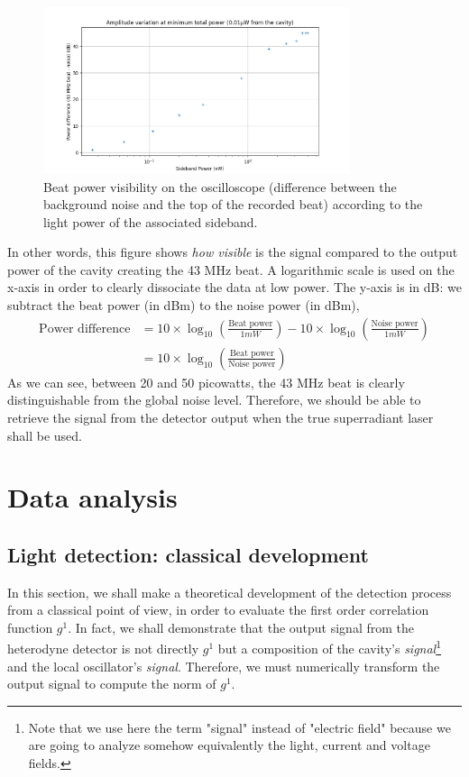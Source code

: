 \documentclass[11pt]{report}
\begin{document}
\begin{figure}[h!]
\centering
\includegraphics[width=0.8\textwidth]{sb-power-visibility}
\caption{Beat power visibility on the oscilloscope (difference between the background noise and the top of the recorded beat) according to the light power of the associated sideband.}
\label{fig:sb-power-visibility}
\end{figure}

In other words, this figure shows \textit{how visible} is the signal compared to the output power of the cavity creating the 43 MHz beat. A logarithmic scale is used on the x-axis in order to clearly dissociate the data at low power. The y-axis is in dB: we subtract the beat power (in dBm) to the noise power (in dBm),
\begin{align}
\textrm{Power difference} &= 10 \times \log_{10}\left( \frac{\textrm{Beat power}}{1 mW} \right) - 10 \times \log_{10}\left( \frac{\textrm{Noise power}}{1 mW} \right) \\
&= 10 \times \log_{10}\left( \frac{\textrm{Beat power}}{\textrm{Noise power}} \right)
\end{align}
As we can see, between 20 and 50 picowatts, the 43 MHz beat is clearly distinguishable from the global noise level. Therefore, we should be able to retrieve the signal from the detector output when the true superradiant laser shall be used.

\chapter{Data analysis}
\label{data_analysis_chapter}
\section{Light detection: classical development}

In this section, we shall make a theoretical development of the detection process from a classical point of view, in order to evaluate the first order correlation function $g^1$. In fact, we shall demonstrate that the output signal from the heterodyne detector is not directly $g^1$ but a composition of the cavity's \textit{signal}\footnote{Note that we use here the term "signal" instead of "electric field" because we are going to analyze somehow equivalently the light, current and voltage fields.} and the local oscillator's \textit{signal}. Therefore, we must numerically transform the output signal to compute the norm of $g^1$.
\end{document}
